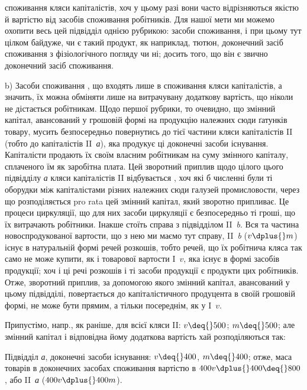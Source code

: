 \parcont{}  %
споживання кляси капіталістів, хоч у цьому разі вони часто відрізняються
якістю й вартістю від засобів споживання робітників. Для нашої мети
ми можемо охопити весь цей підвідділ однією рубрикою: 
засоби споживання, і при цьому тут цілком байдуже, чи є такий продукт,
як наприклад, тютюн, доконечний засіб споживання з фізіологічного
погляду чи ні; досить того, що він є звично доконечний засіб споживання.

b) Засоби споживання \deq{} , що входять лише в
споживання кляси капіталістів, а значить, їх можна обміняти лише на
витрачувану додаткову вартість, що ніколи не дістається робітникам.
Щодо першої рубрики, то очевидно, що змінний капітал, авансований у
грошовій формі на продукцію належних сюди ґатунків товару, мусить
безпосередньо повернутись до тієї частини кляси капіталістів II (тобто
до капіталістів II~\emph{а}), яка продукує ці доконечні засоби існування.
Капіталісти продають їх своїм власним робітникам на суму змінного капіталу,
сплаченого їм як заробітна плата. Цей зворотний приплив щодо цілого
цього підвідділу \emph{а} кляси капіталістів II відбувається ,
хоч які б численні були ті оборудки між капіталістами різних належних
сюди галузей промисловости, через що розподіляється pro rata
цей змінний капітал, який зворотно припливає. Це процеси циркуляції,
що для них засоби циркуляції є безпосередньо ті гроші, що їх витрачають
робітники. Інакше стоїть справа з підвідділом II~\emph{b}. Вся та частина
новоспродукованої вартости, що з нею ми маємо тут справу, II~\emph{b} ($v \dplus{} m$)
існує в натуральній формі речей розкошів, тобто речей, що їх робітнича
кляса так само не може купити, як і товарової вартости I~$v$, яка існує
в формі засобів продукції; хоч і ці речі розкошів і ті засоби продукції
є продукти цих робітників. Отже, зворотний приплив, за допомогою
якого змінний капітал, авансований у цьому підвідділі, повертається до
капіталістичного продуцента в своїй грошовій формі, не може бути
прямим, а тільки посереднім, як у I~$v$.

\label{original-310}
Припустімо, напр., як раніше, для всієї кляси II: $v \deq{} 500$; $m \deq{} 500$;
але змінний капітал і відповідна йому додаткова вартість хай розподіляються
так:

\noindent{}Підвідділ \emph{а}, доконечні засоби існування: $v \deq{} 400$, $m \deq{} 400$; отже,
маса товарів в доконечних засобах споживання вартістю в $400 v \dplus{} 400 \deq{} 800$,
або II~\emph{а} ($400 v \dplus{} 400 m$).

